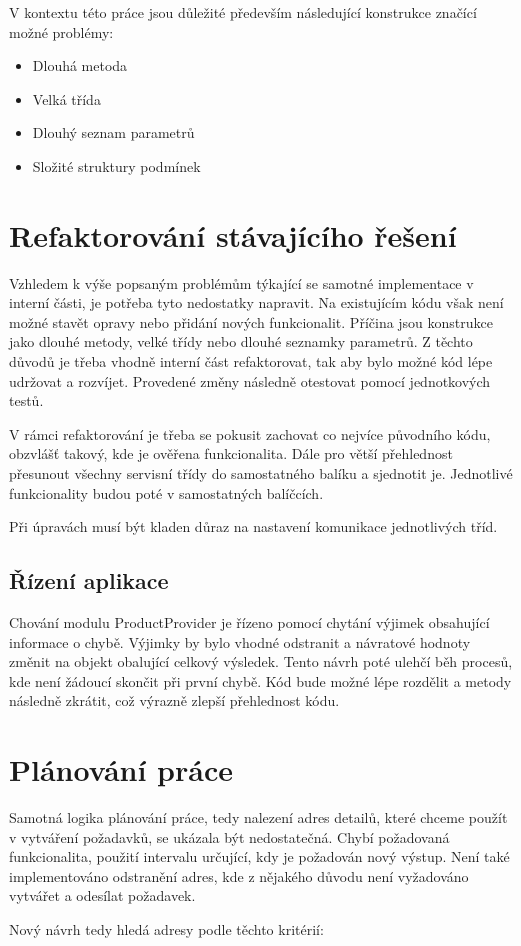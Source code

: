 \documentclass[thesis=B,czech]{FITthesis}[2012/06/26]
\begin{document}
V kontextu této práce jsou důležité především následující konstrukce značící možné problémy: \cite{refaktoring} 
\begin{itemize}
\item Dlouhá metoda
\item Velká třída
\item Dlouhý seznam parametrů
\item Složité struktury podmínek
\end{itemize}

\section{Refaktorování stávajícího řešení}
Vzhledem k výše popsaným problémům týkající se samotné implementace v interní části, je potřeba tyto nedostatky napravit.
Na existujícím kódu však není možné stavět opravy nebo přidání nových funkcionalit. Příčina jsou konstrukce jako
dlouhé metody, velké třídy nebo dlouhé seznamky parametrů.
Z těchto důvodů je třeba vhodně interní část refaktorovat, tak aby bylo možné kód lépe udržovat a rozvíjet. Provedené změny následně 
otestovat pomocí jednotkových testů.
\par
V rámci refaktorování je třeba se pokusit zachovat co nejvíce původního kódu, obzvlášť takový, kde je ověřena funkcionalita.
Dále pro větší přehlednost přesunout všechny servisní třídy do samostatného balíku a sjednotit je. Jednotlivé funkcionality
budou poté v samostatných balíčcích.
\par
Při úpravách musí být kladen důraz na nastavení komunikace jednotlivých tříd.

\subsection{Řízení aplikace}
Chování modulu ProductProvider je řízeno pomocí chytání výjimek obsahující informace o chybě. 
Výjimky by bylo vhodné odstranit a návratové hodnoty změnit na objekt obalující celkový výsledek. Tento návrh poté ulehčí běh procesů, kde není žádoucí
skončit při první chybě. Kód bude možné lépe rozdělit a metody následně zkrátit, což výrazně zlepší přehlednost kódu.

\section{Plánování práce}
Samotná logika plánování práce, tedy nalezení adres detailů, které chceme použít v vytváření požadavků, se ukázala být nedostatečná. Chybí 
požadovaná funkcionalita, použití intervalu určující, kdy je požadován nový výstup. Není také implementováno odstranění adres, kde
z nějakého důvodu není vyžadováno vytvářet a odesílat požadavek.
\par
Nový návrh tedy hledá adresy podle těchto kritérií:
\end{document}
